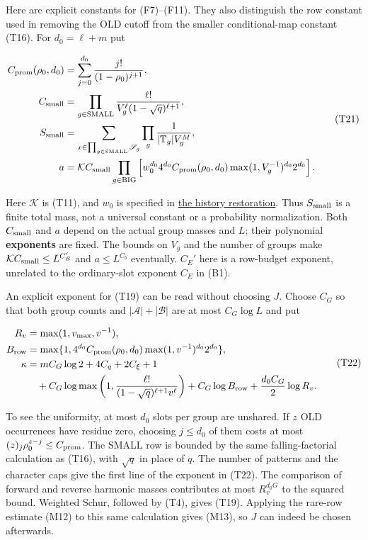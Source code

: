 Here are explicit constants for (F7)--(F11). They also distinguish the
row constant used in removing the OLD cutoff from the smaller
conditional-map constant (T16). For \(d_0=\ell+m\) put

\[
\begin{aligned}
C_{\rm prom}(\rho_0,d_0)&=\sum_{j=0}^{d_0}\frac{j!}{(1-\rho_0)^{j+1}},\\
C_{\rm small}&=\prod_{g\in\mathrm{SMALL}}
       \frac{\ell!}{V_g^\ell(1-\sqrt q)^{\ell+1}},\\
S_{\rm small}&=\sum_{x\in\prod_{g\in\mathrm{SMALL}}\mathscr S_g}
                    \prod_g\frac1{|\mathbb T_g|V_g^M},\\
a&=\mathcal K C_{\rm small}
 \prod_{g\in\mathrm{BIG}}
 \left[w_0^{d_0}4^{d_0}C_{\rm prom}(\rho_0,d_0)
                 \max(1,V_g^{-1})^{d_0}2^{d_0}\right].
\end{aligned}\tag{T21}
\]

Here \(\mathcal K\) is (T11), and \(w_0\) is specified in
\protect\hyperlink{marked-correlation-restoring-all-histories}{the
history restoration}. Thus \(S_{\rm small}\) is a finite total mass, not
a universal constant or a probability normalization. Both
\(C_{\rm small}\) and \(a\) depend on the actual group masses and \(L\);
their polynomial \textbf{exponents} are fixed. The bounds on \(V_g\) and
the number of groups make \(\mathcal K C_{\rm small}\le L^{C_E'}\) and
\(a\le L^{C_b}\) eventually. \(C_E'\) here is a row-budget exponent,
unrelated to the ordinary-slot exponent \(C_E\) in (B1).

An explicit exponent for (T19) can be read without choosing \(J\).
Choose \(C_G\) so that both group counts and
\(|\mathcal A|+|\mathcal B|\) are at most \(C_G\log L\) and put

\[
\begin{aligned}
R_v&=\max(1,v_{\max},v^{-1}),\\
B_{\rm row}&=\max\{1,4^{d_0}C_{\rm prom}(\rho_0,d_0)
                                  \max(1,v^{-1})^{d_0}2^{d_0}\},\\
\kappa&=mC_G\log2+4C_q+2C_\xi+1\\
&\quad+C_G\log\max\left(1,
             \frac{\ell!}{(1-\sqrt q)^{\ell+1}v^\ell}\right)
       +C_G\log B_{\rm row}+\frac{d_0C_G}2\log R_v.
\end{aligned}\tag{T22}
\]

To see the uniformity, at most \(d_0\) slots per group are unshared. If
\(z\) OLD occurrences have residue zero, choosing \(j\le d_0\) of them
costs at most \((z)_j\rho_0^{z-j}\le C_{\rm prom}\). The SMALL row is
bounded by the same falling-factorial calculation as (T16), with
\(\sqrt q\) in place of \(q\). The number of patterns and the character
caps give the first line of the exponent in (T22). The comparison of
forward and reverse harmonic masses contributes at most \(R_v^{d_0G}\)
to the squared bound. Weighted Schur, followed by (T4), gives (T19).
Applying the rare-row estimate (M12) to this same calculation gives
(M13), so \(J\) can indeed be chosen afterwards.

